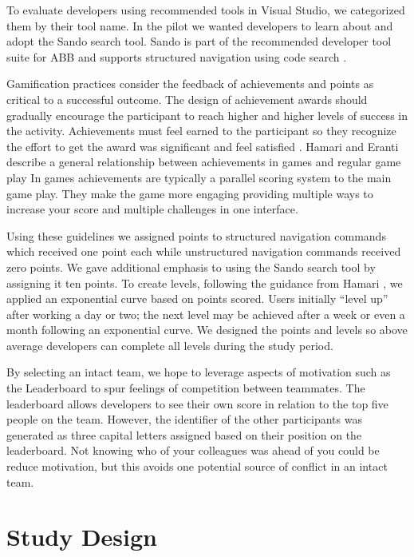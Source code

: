 \documentclass{sig-alternate}
\begin{document}
To evaluate developers using recommended tools in Visual Studio, we categorized them by their tool name.  In the pilot we wanted developers to learn about and adopt the Sando search tool.  Sando is part of the recommended developer tool suite for ABB and supports structured navigation using code search \cite{Shepherd2012Sando}.

Gamification practices consider the feedback of achievements and points as critical to a successful outcome.  The design of achievement awards should gradually encourage the participant to reach higher and higher levels of success in the activity.  Achievements must feel earned to the participant so they recognize the effort to get the award was significant and feel satisfied  \cite{wbsnipes:Hamari2011Framework}.  Hamari and Eranti describe a general relationship between achievements in games and regular game play      In games achievements are typically a parallel scoring system to the main game play.  They make the game more engaging providing multiple ways to increase your score and multiple challenges in one interface.

Using these guidelines we assigned points to structured navigation commands which received one point each while unstructured navigation commands received zero points.    We gave additional emphasis to using the Sando search tool by assigning it ten points.  To create levels, following the guidance from Hamari \cite{wbsnipes:Hamari2011Framework}, we applied an exponential curve based on points scored.  Users initially ``level up'' after  working a day or two; the next level may be achieved after a week or even a month following an exponential curve.  We designed the points and levels so above average developers can complete all levels during the study period.

By selecting an intact team, we hope to leverage aspects of motivation such as the Leaderboard to spur feelings of competition between teammates.    The leaderboard allows developers to see their own score in relation to the top five people on the team.  However, the identifier of the other participants was generated as three capital letters assigned based on their position on the leaderboard.  Not knowing who of your colleagues was ahead of you could be  reduce motivation, but this avoids one potential source of conflict in an intact team.

\section {Study Design}
\end{document}
